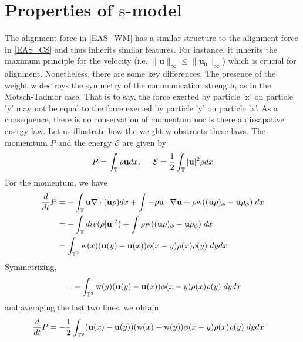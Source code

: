 \documentclass[11pt,letterpaper]{amsart}
\theoremstyle{plain}
\theoremstyle{definition}
\theoremstyle{remark}
\newcommand{\T}{\ensuremath{\mathbb{T}}}   %
\def \cE {\mathcal{E}}
\renewcommand{\leq}{\leqslant}
\def\T{\mathbb{T}}
\def\u{\textbf{u}}
\def \st {\mathrm{s}}
\def \wt {\mathrm{w}}
\begin{document}
\section{Properties of $\st$-model}
\label{Properties}
The alignment force in \eqref{EAS_WM} has a similar structure to the alignment force in \eqref{EAS_CS} and thus inherits 
similar features. For instance, it inherits the maximum principle for the velocity (i.e. $\|\u\|_{\infty} \leq \|\u_0\|_{\infty}$) 
which is crucial for alignment. 
Nonetheless, there are some key differences.  The presence of the weight $\wt$ destroys the symmetry of the communication strength, 
as in the Motsch-Tadmor case.  That is to say, the force exerted by particle 'x' on particle 'y' may not be equal to the force exerted by particle 
'y' on particle 'x'.  As a consequence, there is no conservation of momentum nor is there a dissapative energy law.  
Let us illustrate how the weight $\wt$ obstructs these laws. 
The momemtum $P$ and the energy $\cE$ are given by 
\begin{align*}
    P = \int_{\T} \rho \u dx, \hspace{5mm} \cE = \frac{1}{2} \int_{\T} |\u|^2 \rho dx 
\end{align*}
For the momentum, we have  
\begin{align*}
    \frac{d}{dt} P
    &= - \int_{\T} \u \nabla \cdot (\u \rho) dx + \int -\rho \u \cdot \nabla \u + \rho \wt ((\u\rho)_{\phi} - \u \rho_{\phi}) \hspace{1mm} dx \\
    &= - \int_{\T} div(\rho |\u|^2) + \int \rho \wt ((\u\rho)_{\phi} - \u \rho_{\phi}) \hspace{1mm} dx \\
    &= \int_{\T^2} \wt(x) (\u(y) - \u(x)) \phi(x-y) \rho(x) \rho(y) \hspace{1mm} dy dx \\
\end{align*}
Symmetrizing,  
\begin{align*}
    &= -\int_{\T^2} \wt(y)  (\u(y) - \u(x)) \phi(x-y) \rho(x) \rho(y) \hspace{1mm} dy dx \\
\end{align*}
and averaging the last two lines, we obtain 
\begin{align}
    \label{momemtum_time_deriv}
    \frac{d}{dt} P 
        &= -\frac{1}{2} \int_{\T^2} (\u(x) - \u(y)) (\wt(x) - \wt(y)) \phi(x-y) \rho(x) \rho(y) \hspace{1mm} dy dx 
\end{align}
\end{document}
